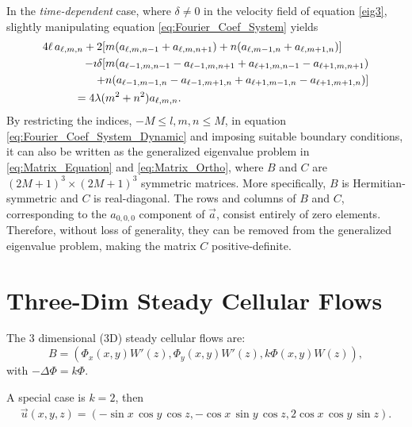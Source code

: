 \documentclass{article}
\newcommand{\be}{\begin{equation}}
\newcommand{\ee}{\end{equation}}
\newcommand{\0}{\mathbf{0}}
\newcommand{\1}{\mathbf{1}}
\newcommand{\2}{\mathbf{2}}
\newcommand{\3}{\mathbf{3}}
\newcommand{\4}{\mathbf{4}}
\newcommand{\5}{\mathbf{5}}
\newcommand{\6}{\mathbf{6}}
\newcommand{\7}{\mathbf{7}}
\newcommand{\8}{\mathbf{8}}
\begin{document}
In the \emph{time-dependent} case, where $\delta\neq0$ in the velocity field
of equation \eqref{eig3}, slightly manipulating equation
\eqref{eq:Fourier_Coef_System} yields 
%
\begin{align}\label{eq:Fourier_Coef_System_Dynamic}
4\ell\,a_{\ell,m,n}
+2[&m(a_{\ell,m,n-1}+a_{\ell,m,n+1})+n(a_{\ell,m-1,n}+a_{\ell,m+1,n})]
\notag\\
-\imath\delta[&m(a_{\ell-1,m,n-1}-a_{\ell-1,m,n+1}+a_{\ell+1,m,n-1}-a_{\ell+1,m,n+1})\notag\\
    +&n(a_{\ell-1,m-1,n}-a_{\ell-1,m+1,n}+a_{\ell+1,m-1,n}-a_{\ell+1,m+1,n})] 
\notag\\
=4\lambda(&m^2+n^2)a_{\ell,m,n}.
\end{align}
%
By restricting the indices, $-M\leq l,m,n\leq M$, in equation
\eqref{eq:Fourier_Coef_System_Dynamic} and imposing suitable boundary 
conditions, it can also be
written as the generalized eigenvalue problem in
\eqref{eq:Matrix_Equation} and \eqref{eq:Matrix_Ortho}, where  $B$ and
$C$ are $(2M+1)^3\times(2M+1)^3$ symmetric matrices. More specifically,
$B$ is Hermitian-symmetric and $C$ is real-diagonal. The rows and
columns of $B$ and $C$, corresponding to the $a_{0,0,0}$ component of
$\vec{a}$, consist entirely of zero elements. Therefore, without loss
of generality, they can be removed from the generalized eigenvalue
problem, making the matrix $C$ positive-definite.  






\section{Three-Dim Steady Cellular Flows}
The 3 dimensional (3D) steady cellular flows are:
\be
B =
(\Phi_x(x,y)W'(z),\Phi_y(x,y)W'(z),k\Phi(x,y)W(z)), \label{3dcell}
\ee
with $-\Delta \Phi = k \Phi.$   
\medskip

A special case is $k=2$, then
%
\begin{align}\label{3dcell-1}
  \vec{u}(x,y,z) =
  (-\sin{x}\,\cos{y}\,\cos{z},-\cos{x}\,\sin{y}\,\cos{z},2\cos{x}\,\cos{y}\,\sin{z}).  
\end{align}

\medskip


\end{document}
